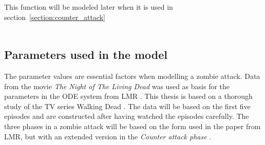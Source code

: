 \documentclass[%
twoside,                 %
final,                   %
chapterprefix=true,      %
open=right               %
10pt]{book}
\begin{document}
\noindent
This function will be modeled later when it is used in section~\ref{section:counter_attack}
\\
\\

\subsection{Parameters used in the model}
The parameter values are essential factors when modelling a zombie attack. Data from the movie \emph{The Night of The Living Dead} was used as basis for the parameters in the ODE system from LMR \cite{zombie-math}. This thesis is based on a thorough study of the TV series Walking Dead \cite{walking_dead}. The data will be based on the first five episodes and are constructed after having watched the episodes carefully. The three phases in a zombie attack will be based on the form used in the paper from LMR, but with an extended version in the \emph{Counter attack phase} .
\end{document}
